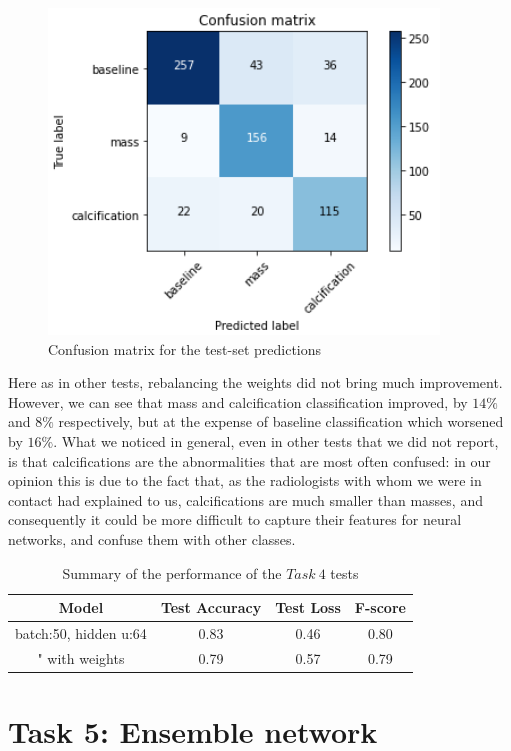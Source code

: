 \documentclass[11pt,a4paper,oneside]{article}
\begin{document}
\begin{figure}[h]
\begin{minipage}[c]{.4\textwidth}
		\label{fig:4_acc_w}
	\end{minipage}
	\hspace{5mm}%
	\begin{minipage}[c]{.4\textwidth}
		\centering\setlength{\captionmargin}{0pt}%
		\includegraphics[width=.9\textwidth]{images/4.1/2_matrix}
		\caption{Confusion matrix for the test-set predictions}
		\label{fig:4_matrix_w}
	\end{minipage}%
\end{figure}

Here as in other tests, rebalancing the weights did not bring much improvement. However, we can see that mass and calcification classification improved, by $14\%$ and $8\%$ respectively, but at the expense of baseline classification which worsened by $16\%$. What we noticed in general, even in other tests that we did not report, is that calcifications are the abnormalities that are most often confused: in our opinion this is due to the fact that, as the radiologists with whom we were in contact had explained to us, calcifications are much smaller than masses, and consequently it could be more difficult to capture their features for neural networks, and confuse them with other classes.



\begin{table}
\centering
	\begin{tabular}{|cccc|}
	\hline
	Model & Test Accuracy & Test Loss & F-score \\
	\hline
	batch:50, hidden u:64 & 0.83 & 0.46 & 0.80 \\
	"    with weights & 0.79 & 0.57 & 0.79 \\
	\hline
	\end{tabular}
\caption{Summary of the performance of the $Task\ 4$ tests}
\end{table}

\clearpage

\section{Task 5: Ensemble network}
\end{document}
